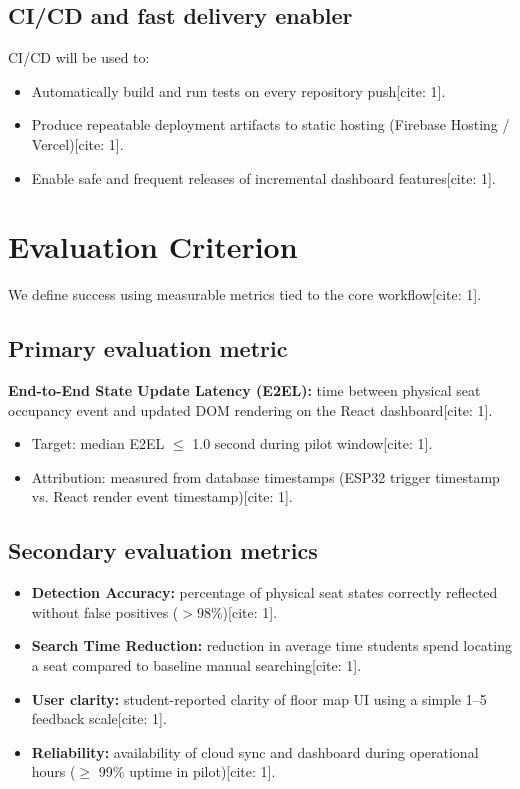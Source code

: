 \documentclass[11pt,a4paper]{article}
\begin{document}
\subsection{CI/CD and fast delivery enabler}
CI/CD will be used to:
\begin{itemize}[leftmargin=0.7cm]
    \item Automatically build and run tests on every repository push[cite: 1].
    \item Produce repeatable deployment artifacts to static hosting (Firebase Hosting / Vercel)[cite: 1].
    \item Enable safe and frequent releases of incremental dashboard features[cite: 1].
\end{itemize}

\section{Evaluation Criterion}
We define success using measurable metrics tied to the core workflow[cite: 1].

\subsection{Primary evaluation metric}
\textbf{End-to-End State Update Latency (E2EL):} time between physical seat occupancy event and updated DOM rendering on the React dashboard[cite: 1].
\begin{itemize}[leftmargin=0.7cm]
    \item Target: median E2EL $\le$ 1.0 second during pilot window[cite: 1].
    \item Attribution: measured from database timestamps (ESP32 trigger timestamp vs. React render event timestamp)[cite: 1].
\end{itemize}

\subsection{Secondary evaluation metrics}
\begin{itemize}[leftmargin=0.7cm]
    \item \textbf{Detection Accuracy:} percentage of physical seat states correctly reflected without false positives ($> 98\%$)[cite: 1].
    \item \textbf{Search Time Reduction:} reduction in average time students spend locating a seat compared to baseline manual searching[cite: 1].
    \item \textbf{User clarity:} student-reported clarity of floor map UI using a simple 1--5 feedback scale[cite: 1].
    \item \textbf{Reliability:} availability of cloud sync and dashboard during operational hours ($\ge$ 99\% uptime in pilot)[cite: 1].
\end{itemize}
\end{document}
